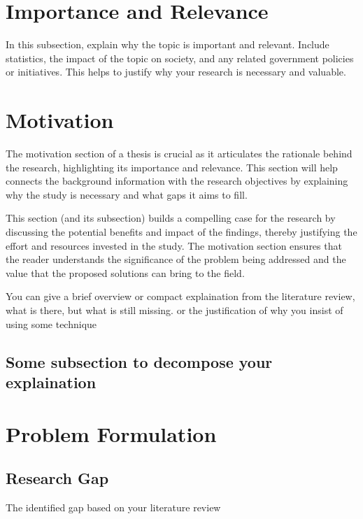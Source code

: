 \section{ Importance and Relevance} 
\label{SplitScheduleExplain}

In this subsection, explain why the topic is important and relevant. Include statistics, the impact of the topic on society, and any related government policies or initiatives. This helps to justify why your research is necessary and valuable.




\section{Motivation}

The motivation section of a thesis is crucial as it articulates the rationale behind the research, highlighting its importance and relevance. This section will help connects the background information with the research objectives by explaining why the study is necessary and what gaps it aims to fill. 

This section (and its subsection) builds a compelling case for the research by discussing the potential benefits and impact of the findings, thereby justifying the effort and resources invested in the study. The motivation section ensures that the reader understands the significance of the problem being addressed and the value that the proposed solutions can bring to the field.

You can give a brief overview or compact explaination from the literature review, what is there, but what is still missing. or the justification of why you insist of using some technique


\subsection{Some subsection to decompose your explaination}




\section{Problem Formulation}


\subsection{Research Gap}

The identified gap based on your literature review


